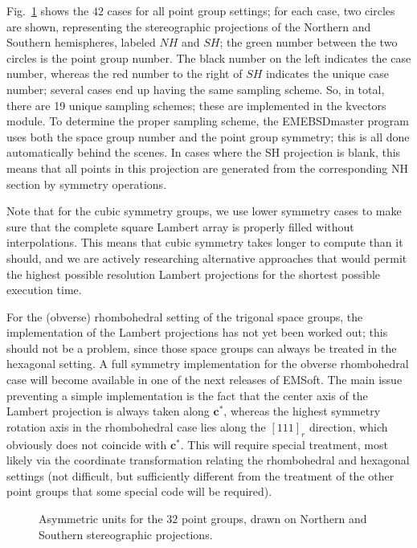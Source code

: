 \documentclass[DIV=calc, paper=letter, fontsize=11pt]{scrartcl}	 %
\begin{document}
Fig.~\ref{fig:hemispheres} shows the $42$ cases for all point group settings; for each case, two circles are shown, representing the 
stereographic projections of the Northern and Southern hemispheres, labeled $NH$ and $SH$; the green number between the two
circles is the point group number.  The black number on the left indicates the case number, whereas the red number to the right of $SH$
indicates the unique case number; several cases end up having the same sampling scheme.  So, in total, there are 19 unique
sampling schemes; these are implemented in the \textsf{kvectors} module.  To determine the proper sampling scheme, the 
\textsf{EMEBSDmaster} program uses both the space group number and the point group symmetry; this is all done automatically
behind the scenes.  In cases where the SH projection is blank, this means that all points in this projection are generated from the 
corresponding NH section by symmetry operations.

Note that for the cubic symmetry groups, we use lower symmetry cases to make sure that the complete square Lambert array
is properly filled without interpolations.  This means that cubic symmetry takes longer to compute than it should, and we are 
actively researching alternative approaches that would permit the highest possible resolution Lambert projections for the 
shortest possible execution time.

For the (obverse) rhombohedral setting of the trigonal space groups, the implementation of the Lambert projections has 
not yet been worked out; this should not be a problem, since those space groups can always be treated in the hexagonal
setting.  A full symmetry implementation for the obverse rhombohedral case will become available in one of the next releases
of \textsf{EMSoft}.  The main issue preventing a simple implementation is the fact that the center axis of the Lambert projection
is always taken along $\mathbf{c}^{\ast}$, whereas the highest symmetry rotation axis in the rhombohedral case lies along the 
$[111]_r$ direction, which obviously does not coincide with $\mathbf{c}^{\ast}$.  This will require special treatment, most likely 
via the coordinate transformation relating the rhombohedral and hexagonal settings (not difficult, but sufficiently different 
from the treatment of the other point groups that some special code will be required).

\begin{figure}[t]
\centering\leavevmode
\epsfxsize=6.5in
\caption{\label{fig:hemispheres}Asymmetric units for the $32$ point groups, drawn on Northern and Southern stereographic projections.}
\end{figure}
\end{document}
